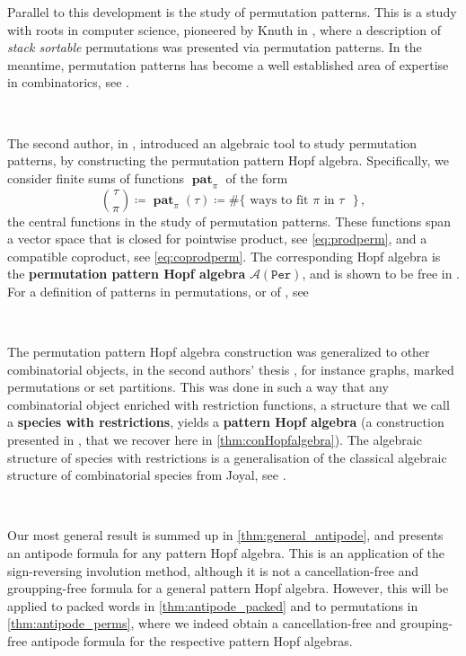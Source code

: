 \documentclass[12pt, reqno]{amsart}
\theoremstyle{definition}
\DeclareMathOperator{\pat}{\mathbf{pat}}
\begin{document}
Parallel to this development is the study of permutation patterns.
This is a study with roots in computer science, pioneered by Knuth in \cite{Knuth}, where a description of \textit{stack sortable} permutations was presented via permutation patterns.
In the meantime, permutation patterns has become a well established area of expertise in combinatorics, see \cite{linton2010permutation}.

\

The second author, in \cite{Vargas}, introduced an algebraic tool to study permutation patterns, by constructing the permutation pattern Hopf algebra.
Specifically, we consider finite sums of functions $\pat_{\pi}$ of the form 
$$ \binom{\tau}{\pi} \coloneqq \pat_{\pi}(\tau)\coloneqq  \#\{\text{ ways to fit $\pi$ in $\tau$ }\}\, ,$$
the central functions in the study of permutation patterns.
These functions span a vector space that is closed for pointwise product, see \eqref{eq:prodperm}, and a compatible coproduct, see \eqref{eq:coprodperm}.
The corresponding Hopf algebra is the \textbf{permutation pattern Hopf algebra} $\mathcal{A}(\mathtt{Per})$, and is shown to be free in \cite{Vargas}.
For a definition of patterns in permutations, or of , see \cite{penaguiao2020algebraic}

\

The permutation pattern Hopf algebra construction was generalized to other combinatorial objects, in the second authors' thesis \cite{Penaguiao2020}, for instance graphs, marked permutations or set partitions.
This was done in such a way that any combinatorial object enriched with restriction functions, a structure that we call a \textbf{species with restrictions}, yields a \textbf{pattern Hopf algebra} (a construction presented in \cite{Penaguiao2020}, that we recover here in \cref{thm:conHopfalgebra}).
The algebraic structure of species with restrictions is a generalisation of the classical algebraic structure of combinatorial species from Joyal, see \cite{AM2010}.


\

Our most general result is summed up in \cref{thm:general_antipode}, and presents an antipode formula for any pattern Hopf algebra.
This is an application of the sign-reversing involution method, although it is not a cancellation-free and groupping-free formula for a general pattern Hopf algebra.
However, this will be applied to packed words in \cref{thm:antipode_packed} and to permutations in \cref{thm:antipode_perms}, where we indeed obtain a cancellation-free and grouping-free antipode formula for the respective pattern Hopf algebras.
\end{document}
